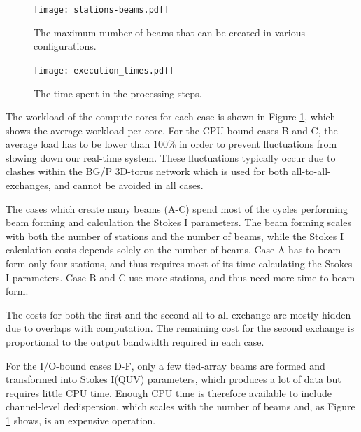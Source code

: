 \documentclass{llncs}
\begin{document}
\begin{figure}[ht]
\begin{minipage}[t]{0.47\textwidth}
\texttt{[image: stations-beams.pdf]}
\label{fig:stations-beams}
\caption{The maximum number of beams that can be created in various configurations.}
\end{minipage}
\hfill
\begin{minipage}[t]{0.47\textwidth}
\texttt{[image: execution\_times.pdf]}
\label{fig:execution-times}
\caption{The time spent in the processing steps.}
\end{minipage}
\end{figure}

The workload of the compute cores for each case is shown in Figure \ref{fig:execution-times}, which shows the average workload per core. For the CPU-bound cases B and C, the average load has to be lower than 100\% in order to prevent fluctuations from slowing down our real-time system. These fluctuations typically occur due to clashes within the BG/P 3D-torus network which is used for both all-to-all-exchanges, and cannot be avoided in all cases.

The cases which create many beams (A-C) spend most of the cycles performing beam forming and calculation the Stokes I parameters. The beam forming scales with both the number of stations and the number of beams, while the Stokes I calculation costs depends solely on the number of beams. Case A has to beam form only four stations, and thus requires most of its time calculating the Stokes I parameters. Case B and C use more stations, and thus need more time to beam form.

The costs for both the first and the second all-to-all exchange are mostly hidden due to overlaps with computation. The remaining cost for the second exchange is proportional to the output bandwidth required in each case.

For the I/O-bound cases D-F, only a few tied-array beams are formed and transformed into Stokes I(QUV) parameters, which produces a lot of data but requires little CPU time. Enough CPU time is therefore available to include channel-level dedispersion, which scales with the number of beams and, as Figure \ref{fig:execution-times} shows, is an expensive operation.



\end{document}

